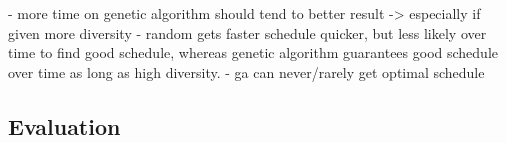 \documentclass{article}
\begin{document}
\begin{figure}[H]
\centering
\end{figure}

- more time on genetic algorithm should tend to better result -> especially if given more diversity
- random gets faster schedule quicker, but less likely over time to find good schedule, whereas genetic algorithm guarantees good schedule over time as long as high diversity.
- ga can never/rarely get optimal schedule

\subsection{Evaluation}

\printbibliography
\end{document}
